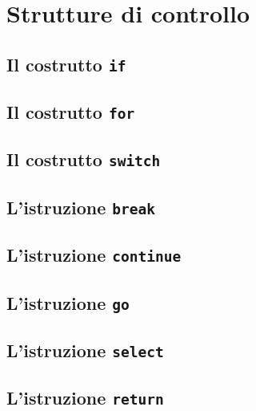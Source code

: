 \chapter{Strutture di controllo}
\section{Il costrutto \texttt{if}}
\section{Il costrutto \texttt{for}}
\section{Il costrutto \texttt{switch}}
\section{L'istruzione \texttt{break}}
\section{L'istruzione \texttt{continue}}
\section{L'istruzione \texttt{go}}
\section{L'istruzione \texttt{select}}
\section{L'istruzione \texttt{return}}
